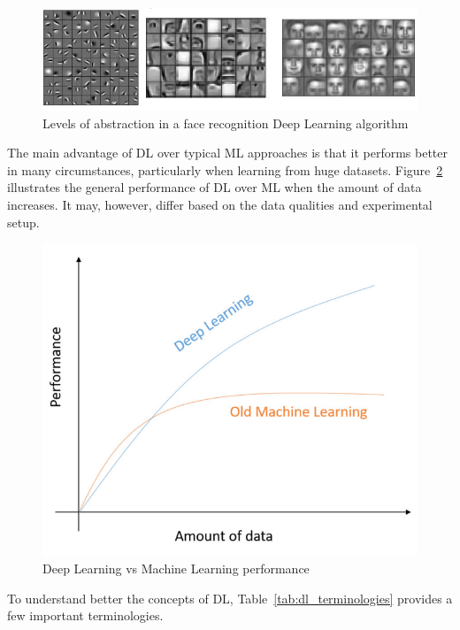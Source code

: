 \begin{figure}[htbp]
    \centering
    \includegraphics[width=\linewidth]{Chapters/Figures/face_recog.jpg}
    \caption{Levels of abstraction in a face recognition Deep Learning algorithm~\cite{Mohra2019DeepRecognition}}
    \label{fig:face_recog}
\end{figure}

The main advantage of \gls{DL} over typical \gls{ML} approaches is that it performs better in many circumstances, particularly when learning from huge datasets. Figure~\ref{fig:DL_vs_ML} illustrates the general performance of \gls{DL} over \gls{ML} when the amount of data increases. It may, however, differ based on the data qualities and experimental setup.

\begin{figure}[htbp]
    \centering
    \includegraphics[width=0.5\linewidth]{Chapters/Figures/DL_vs_ML.png}
    \caption{Deep Learning vs Machine Learning performance~\cite{Alom2019AArchitectures}}
    \label{fig:DL_vs_ML}
\end{figure}

To understand better the concepts of \gls{DL}, Table~\ref{tab:dl_terminologies} provides a few important terminologies.


